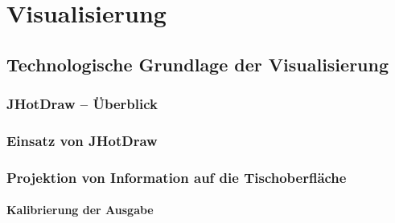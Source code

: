 \chapter{Visualisierung} %
\label{cha:visualisierung}

\section{Technologische Grundlage der Visualisierung} %
\label{sec:technologische_grundlage_der_visualisierung}

\subsection{JHotDraw – Überblick} %
\label{sub:jhotdraw_Überblick}

\subsection{Einsatz von JHotDraw} %
\label{sub:einsatz_von_jhotdraw}

\subsection{Projektion von Information auf die Tischoberfläche} %
\label{sub:projektion_von_information_auf_die_tischoberfläche}

\subsubsection{Kalibrierung der Ausgabe} %
\label{ssub:kalibrierung_der_ausgabe}


